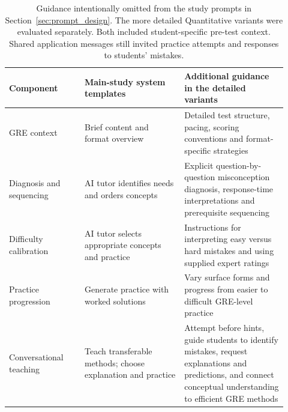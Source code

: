 \begin{table}[t]
\centering
\caption{Guidance intentionally omitted from the study prompts in Section~\ref{sec:prompt_design}. The more detailed Quantitative variants were evaluated separately. Both included student-specific pre-test context. Shared application messages still invited practice attempts and responses to students' mistakes.}\label{tab:prompt_instruction_scope}
\begin{tabular}{p{0.25\linewidth}p{0.33\linewidth}p{0.34\linewidth}}
\toprule
Component & Main-study system templates & Additional guidance in the detailed variants\\
\midrule
GRE context & Brief content and format overview & Detailed test structure, pacing, scoring conventions and format-specific strategies\\
Diagnosis and sequencing & AI tutor identifies needs and orders concepts & Explicit question-by-question misconception diagnosis, response-time interpretations and prerequisite sequencing\\
Difficulty calibration & AI tutor selects appropriate concepts and practice & Instructions for interpreting easy versus hard mistakes and using supplied expert ratings\\
Practice progression & Generate practice with worked solutions & Vary surface forms and progress from easier to difficult GRE-level practice\\
Conversational teaching & Teach transferable methods; choose explanation and practice & Attempt before hints, guide students to identify mistakes, request explanations and predictions, and connect conceptual understanding to efficient GRE methods\\
\bottomrule
\end{tabular}
\end{table}